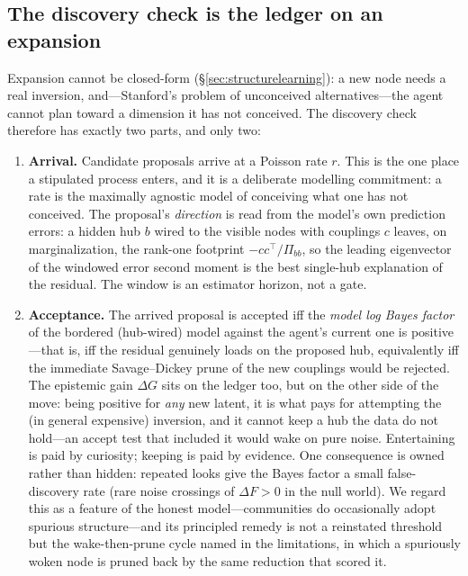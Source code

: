 \subsection{The discovery check is the ledger on an expansion}

Expansion cannot be closed-form (\S\ref{sec:structurelearning}): a new node needs a real
inversion, and---Stanford's problem of unconceived alternatives---the agent cannot plan toward
a dimension it has not conceived. The discovery check therefore has exactly two parts, and only
two:

\begin{enumerate}
\item \textbf{Arrival.} Candidate proposals arrive at a Poisson rate $r$. This is the one
place a stipulated process enters, and it is a deliberate modelling commitment: a rate is the
maximally agnostic model of conceiving what one has not conceived. The proposal's
\emph{direction} is read from the model's own prediction errors: a hidden hub $b$ wired to the
visible nodes with couplings $c$ leaves, on marginalization, the rank-one footprint
$-cc^{\!\top}/\Pi_{bb}$, so the leading eigenvector of the windowed error second moment is the
best single-hub explanation of the residual. The window is an estimator horizon, not a gate.
\item \textbf{Acceptance.} The arrived proposal is accepted iff the \emph{model log Bayes
factor} of the bordered (hub-wired) model against the agent's current one is positive---that
is, iff the residual genuinely loads on the proposed hub, equivalently iff the immediate
Savage--Dickey prune of the new couplings would be rejected. The epistemic gain $\Delta G$ sits
on the ledger too, but on the other side of the move: being positive for \emph{any} new latent,
it is what pays for attempting the (in general expensive) inversion, and it cannot keep a hub
the data do not hold---an accept test that included it would wake on pure noise. Entertaining
is paid by curiosity; keeping is paid by evidence. One consequence is owned rather than hidden:
repeated looks give the Bayes factor a small false-discovery rate (rare
noise crossings of $\Delta F>0$ in the null world). We regard this as a feature of the honest
model---communities do occasionally adopt spurious structure---and its principled remedy is not
a reinstated threshold but the wake-then-prune cycle named in the limitations, in which a
spuriously woken node is pruned back by the same reduction that scored it.
\end{enumerate}

